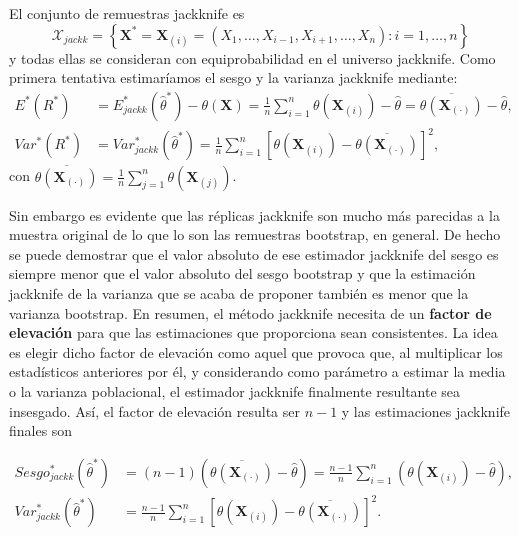 \documentclass[]{book}
\theoremstyle{definition}
\theoremstyle{definition}
\theoremstyle{definition}
\theoremstyle{remark}
\begin{document}
El conjunto de remuestras jackknife es
\[\mathcal{X}_{jackk}=\left\{ \mathbf{X}^{\ast}=
\mathbf{X}_{(i)}=\left( X_1,\ldots ,X_{i-1},X_{i+1},\ldots
,X_n \right) : i=1,\ldots ,n\right\}\] y todas ellas se consideran con
equiprobabilidad en el universo jackknife. Como primera tentativa
estimaríamos el sesgo y la varianza jackknife mediante:
\[\begin{aligned}
E^{\ast}\left( R^{\ast} \right) &= E_{jackk}^{\ast}\left( \hat{\theta}
^{\ast} \right) -\theta \left( \mathbf{X} \right) =\frac{1}{n}
\sum_{i=1}^{n}\theta \left( \mathbf{X}_{(i)} \right) -
\hat{\theta}=\overline{\theta \left( \mathbf{X}_{(\cdot)} \right)}-\hat{\theta}, \\
Var^{\ast}\left( R^{\ast} \right) &= Var_{jackk}^{\ast}\left( \hat{\theta}
^{\ast} \right) =\frac{1}{n}\sum_{i=1}^{n}\left[ \theta \left( 
\mathbf{X}_{(i)} \right) -\overline{\theta \left( 
\mathbf{X}_{(\cdot)} \right)}\right]^2,
\end{aligned}\] con
\(\overline{\theta \left( \mathbf{X}_{(\cdot)} \right)} = \frac{1}{n}\sum_{j=1}^{n}\theta \left( \mathbf{X}_{(j)} \right)\).

Sin embargo es evidente que las réplicas jackknife son mucho más
parecidas a la muestra original de lo que lo son las remuestras
bootstrap, en general. De hecho se puede demostrar que el valor absoluto
de ese estimador jackknife del sesgo es siempre menor que el valor
absoluto del sesgo bootstrap y que la estimación jackknife de la
varianza que se acaba de proponer también es menor que la varianza
bootstrap. En resumen, el método jackknife necesita de un \textbf{factor
de elevación} para que las estimaciones que proporciona sean
consistentes. La idea es elegir dicho factor de elevación como aquel que
provoca que, al multiplicar los estadísticos anteriores por él, y
considerando como parámetro a estimar la media o la varianza
poblacional, el estimador jackknife finalmente resultante sea insesgado.
Así, el factor de elevación resulta ser \(n-1\) y las estimaciones
jackknife finales son

\[\begin{aligned}
Sesgo_{jackk}^{\ast}\left( \hat{\theta}^{\ast} \right) &= \left( n-1 \right)
\left( \overline{\theta \left( \mathbf{X}_{(\cdot)}
 \right)}-\hat{\theta} \right) =\frac{n-1}{n}\sum_{i=1}^{n}\left( \theta
\left( \mathbf{X}_{(i)} \right) -\hat{\theta} \right), \\
Var_{jackk}^{\ast}\left( \hat{\theta}^{\ast} \right) &= \frac{n-1}{n}
\sum_{i=1}^{n}\left[ \theta \left( \mathbf{X}_{(i)}
 \right) -\overline{\theta \left( \mathbf{X}_{(\cdot)}
 \right)}\right]^2.
\end{aligned}\]
\end{document}
